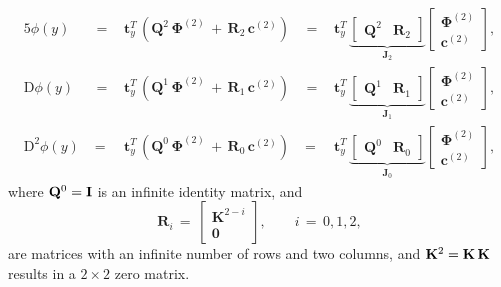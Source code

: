 \documentclass[%
secnumarabic,%
 amssymb, amsmath,%
 aps,prf,superscriptaddress,longbibliography
frontmatterverbose,
]{revtex4-2}
\begin{document}
\begin{alignat}{5}
  \phi(y) 
   &~\,= ~\,& 
   \mathbf t_y^T \, ( \mathbf Q^2 \, \mathbf \Phi^{(2)} \, + \, \mathbf R_2 \, \mathbf c^{(2)} )
   &~\,= ~\,& 	
   \mathbf t_y^T  
   \, 
   \underbrace{\left[\begin{array}{cc} \mathbf Q^2 &  \mathbf R_2 \end{array}\right]}_{\mathbf{J}_2}\left[\begin{array}{c}\boldsymbol \Phi^{(2)} \\ \mathbf c^{(2)}  \end{array}\right],
   \label{eq:rndu}
	\\
	\mathrm D \phi (y) 
  &~\,= ~\,&  
  \mathbf t_y^T \, ( \mathbf Q^1 \, \mathbf \Phi^{(2)} \,+ \, \mathbf R_1 \, \mathbf c^{(2)} )
  &~\,= ~\,& 
  \mathbf t_y^T \, \underbrace{\left[\begin{array}{cc} \mathbf Q^1 &  \mathbf R_1 \end{array}\right]}_{\mathbf J_1}\left[\begin{array}{c}\mathbf \Phi^{(2)} \\ \mathbf c^{(2)}  \end{array}\right],
	\label{eq:rndDu}
	\\
	\mathrm D^2 \phi (y) 
  &\;=\;& 
  \mathbf t_y^T \, ( \mathbf Q^0 \, \mathbf \Phi^{(2)} \,+ \, \mathbf R_0 \, \mathbf c^{(2)} )
  &\; = \;& 
  \mathbf t_y^T \, \underbrace{\left[\begin{array}{cc} \mathbf Q^0 &  \mathbf R_0 \end{array}\right]}_{\mathbf J_0}\left[\begin{array}{c}\mathbf \Phi^{(2)} \\ \mathbf c^{(2)}  \end{array}\right],
	\label{eq:rndD2u}
\end{alignat} 
where $\mathbf{Q}^0 = \mathbf I$ is an infinite identity matrix, and
	\[
    \mathbf R_{i} 
    \, = \,
  \left[\begin{array}{c} \mathbf K^{2-i} \\ \mathbf 0\end{array} \right],
    \qquad 
    i \, = \, 0, 1, 2,
	\]
are matrices with an infinite number of rows and two columns, and $\mathbf K^2 = \mathbf K\,\mathbf K$ results in a $2 \times 2$ zero matrix. 
\end{document}
